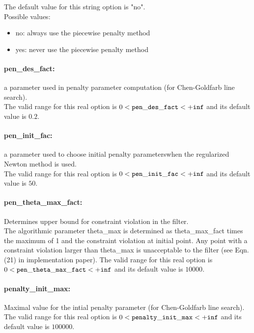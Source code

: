 The default value for this string option is "no".
\\ 
Possible values:
\begin{itemize}
   \item no: always use the piecewise penalty method
   \item yes: never use the piecewise penalty method
\end{itemize}

\paragraph{pen\_des\_fact:}\label{sec:pen_des_fact} a parameter used in penalty parameter computation (for Chen-Goldfarb line search). $\;$ \\
 The valid range for this real option is 
$0 <  {\tt pen\_des\_fact } <  {\tt +inf}$
and its default value is $0.2$.


\paragraph{pen\_init\_fac:}\label{sec:pen_init_fac} a parameter used to choose initial penalty parameterswhen the regularized Newton method is used. $\;$ \\
 The valid range for this real option is 
$0 <  {\tt pen\_init\_fac } <  {\tt +inf}$
and its default value is $50$.


\paragraph{pen\_theta\_max\_fact:}\label{sec:pen_theta_max_fact} Determines upper bound for constraint violation in the filter. $\;$ \\
 The algorithmic parameter theta\_max is
determined as theta\_max\_fact times the maximum
of 1 and the constraint violation at initial
point.  Any point with a constraint violation
larger than theta\_max is unacceptable to the
filter (see Eqn. (21) in implementation paper). The valid range for this real option is 
$0 <  {\tt pen\_theta\_max\_fact } <  {\tt +inf}$
and its default value is $10000$.


\paragraph{penalty\_init\_max:}\label{sec:penalty_init_max} Maximal value for the intial penalty parameter (for Chen-Goldfarb line search). $\;$ \\
 The valid range for this real option is 
$0 <  {\tt penalty\_init\_max } <  {\tt +inf}$
and its default value is $100000$.


